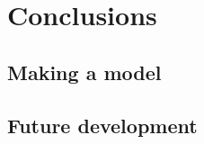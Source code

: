 \chapter{Conclusions}

\section{Making a model}

\section{Future development}
\label{ch:conclusions}
